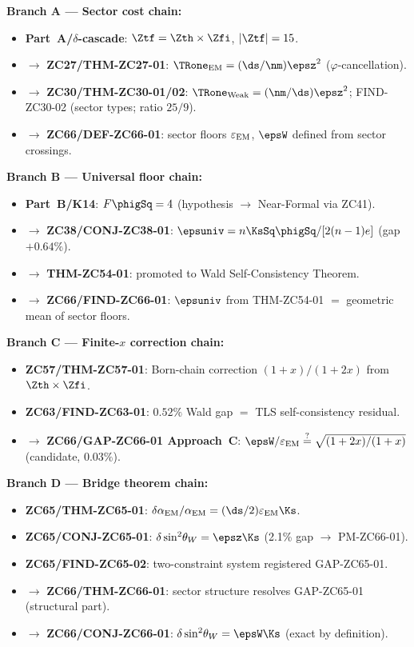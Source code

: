 \documentclass[12pt, a4paper]{article}
\renewcommand{\epsEM}{\varepsilon_{\rm EM}}
\renewcommand{\swsq}{\sin^2\!\theta_W}
\renewcommand{\aEM}{\alpha_{\rm EM}}
\begin{document}
\begin{genealogybox}[title={How ZC66's Key Objects Trace Back}]

\textbf{Branch A --- Sector cost chain:}
\begin{itemize}[leftmargin=2em, noitemsep]
  \item \textbf{Part~A/$\delta$-cascade}:
    $\Ztf = \Zth\times\Zfi$, $|\Ztf| = 15$.
  \item $\to$ \textbf{ZC27/THM-ZC27-01}:
    $\TRone_{\rm EM} = (\ds/\nm)\epsz^{2}$ ($\varphi$-cancellation).
  \item $\to$ \textbf{ZC30/THM-ZC30-01/02}:
    $\TRone_{\rm Weak} = (\nm/\ds)\epsz^{2}$; FIND-ZC30-02
    (sector types; ratio $25/9$).
  \item $\to$ \textbf{ZC66/DEF-ZC66-01}:
    sector floors $\epsEM$, $\epsW$ defined from sector crossings.
\end{itemize}

\textbf{Branch B --- Universal floor chain:}
\begin{itemize}[leftmargin=2em, noitemsep]
  \item \textbf{Part~B/K14}: $F\phigSq = 4$ (hypothesis $\to$ Near-Formal via ZC41).
  \item $\to$ \textbf{ZC38/CONJ-ZC38-01}:
    $\epsuniv = n\KsSq\phigSq/[2(n-1)e]$ (gap $+0.64\%$).
  \item $\to$ \textbf{THM-ZC54-01}: promoted to Wald Self-Consistency Theorem.
  \item $\to$ \textbf{ZC66/FIND-ZC66-01}:
    $\epsuniv$ from THM-ZC54-01 $=$ geometric mean of sector floors.
\end{itemize}

\textbf{Branch C --- Finite-$x$ correction chain:}
\begin{itemize}[leftmargin=2em, noitemsep]
  \item \textbf{ZC57/THM-ZC57-01}:
    Born-chain correction $(1+x)/(1+2x)$ from $\Zth\times\Zfi$.
  \item \textbf{ZC63/FIND-ZC63-01}:
    $0.52\%$ Wald gap $=$ TLS self-consistency residual.
  \item $\to$ \textbf{ZC66/GAP-ZC66-01 Approach~C}:
    $\epsW/\epsEM \stackrel{?}{=} \sqrt{(1+2x)/(1+x)}$
    (candidate, $0.03\%$).
\end{itemize}

\textbf{Branch D --- Bridge theorem chain:}
\begin{itemize}[leftmargin=2em, noitemsep]
  \item \textbf{ZC65/THM-ZC65-01}:
    $\delta\aEM/\aEM = (\ds/2)\epsEM\Ks$.
  \item \textbf{ZC65/CONJ-ZC65-01}:
    $\delta\swsq = \epsz\Ks$ (2.1\% gap $\to$ PM-ZC66-01).
  \item \textbf{ZC65/FIND-ZC65-02}:
    two-constraint system registered GAP-ZC65-01.
  \item $\to$ \textbf{ZC66/THM-ZC66-01}:
    sector structure resolves GAP-ZC65-01 (structural part).
  \item $\to$ \textbf{ZC66/CONJ-ZC66-01}:
    $\delta\swsq = \epsW\Ks$ (exact by definition).
\end{itemize}


\end{genealogybox}
\end{document}
